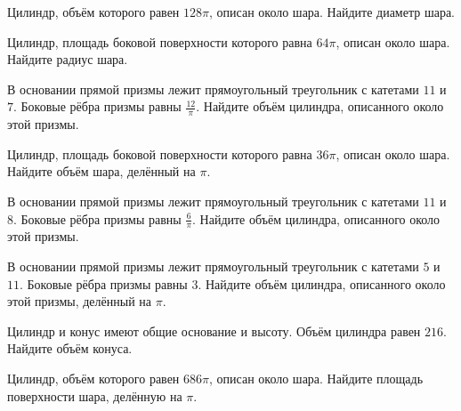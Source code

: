 \documentclass[4apaper]{article}
\begin{document}
\begin{taskBN}{18}
 Цилиндр, объём которого равен $128\pi$, описан около шара. Найдите диаметр шара.
\end{taskBN}

\begin{taskBN}{19}
 Цилиндр, площадь боковой поверхности которого равна $64\pi$, описан около шара. Найдите радиус шара.
\end{taskBN}

\begin{taskBN}{20}
В основании прямой призмы лежит прямоугольный треугольник с катетами $11$ и $7$. Боковые рёбра призмы равны $\frac{12}{\pi}$. Найдите объём цилиндра, описанного около этой призмы.
\end{taskBN}

\begin{taskBN}{21}
 Цилиндр, площадь боковой поверхности которого равна $36\pi$, описан около шара. Найдите объём шара, делённый на $\pi$.
\end{taskBN}

\begin{taskBN}{22}
В основании прямой призмы лежит прямоугольный треугольник с катетами $11$ и $8$. Боковые рёбра призмы равны $\frac{6}{\pi}$. Найдите объём цилиндра, описанного около этой призмы.
\end{taskBN}

\begin{taskBN}{23}
В основании прямой призмы лежит прямоугольный треугольник с катетами $5$ и $11$. Боковые рёбра призмы равны $3$. Найдите объём цилиндра, описанного около этой призмы, делённый на $\pi$.
\end{taskBN}

\begin{taskBN}{24}
Цилиндр и конус имеют общие основание и высоту. Объём цилиндра равен $216$. Найдите объём конуса.
\end{taskBN}

\begin{taskBN}{25}
 Цилиндр, объём которого равен $686\pi$, описан около шара. Найдите площадь поверхности шара, делённую на $\pi$.
\end{taskBN}
\end{document}
